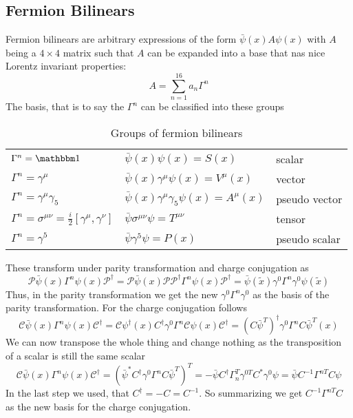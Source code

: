 \subsection{Fermion Bilinears}
Fermion bilinears are arbitrary expressions of the form $\bar \psi(x) A \psi(x)$ with $A$ being a $4 \times 4$ matrix such that $A$ can be expanded into a base that nas nice Lorentz invariant properties:
\[A = \sum_{n= 1}^{16} a_n \Gamma^n\]
The basis, that is to say the $\Gamma^n$ can be classified into these groups
\begin{table}[H]
\centering
\begin{tabular}{lll}
$\Gamma^n = \ehm$ & $\bar \psi(x) \psi(x) = S(x)$ & scalar\\
$\Gamma^n = \gamma^\mu$ & $\bar\psi(x) \gamma^\mu \psi(x) = V^\mu(x)$ & vector\\
$\Gamma^n = \gamma^\mu \gamma_5$&$\bar\psi(x) \gamma^\mu \gamma_5 \psi(x) = A^\mu(x)$ & pseudo vector\\
$\Gamma^n = \sigma^{\mu\nu} = \frac{i}{2} [\gamma^\mu, \gamma^\nu]$&$ \bar\psi \sigma^{\mu\nu} \psi = T^{\mu\nu}$& tensor\\
$\Gamma^n = \gamma^5$&$\bar \psi \gamma^5 \psi = P(x)$& pseudo scalar\\
\end{tabular}
\caption{Groups of fermion bilinears}
\end{table}
These transform under parity transformation and charge conjugation as
\[ \mathcal{P} \bar \psi (x) \Gamma^n \psi(x) \mathcal{P}^\dagger = \mathcal{P} \bar \psi(x)  \mathcal{P}\mathcal{P}^\dagger \Gamma^n \psi(x) \mathcal{P}^\dagger = \bar \psi(\tilde x) \gamma^0 \Gamma^n \gamma^0 \psi(\tilde x)\]
Thus, in the parity transformation we get the new $\gamma^0 \Gamma^n \gamma^0$ as the basis of the parity transformation. For the charge conjugation follows
\[ \mathcal{C} \bar \psi(x) \Gamma^n \psi(x) \mathcal{C}^\dagger = \mathcal C \psi^\dagger(x) C^\dagger \gamma^0 \Gamma^n \mathcal C \psi(x) \mathcal C ^\dagger = ( C \bar \psi^T)^\dagger \gamma^0 \Gamma^n C \bar \psi^T (x)\]
We can now transpose the whole thing and change nothing as the transposition of a scalar is still the same scalar
\[ \mathcal{C} \bar \psi(x) \Gamma^n \psi(x) \mathcal{C}^\dagger = ( \bar \psi ^* C^\dagger \gamma^0 \Gamma^n C \bar \psi ^T )^T = - \bar \psi C^\dagger \Gamma_n^T \gamma^{0T}C^* \gamma^0 \psi = \bar \psi C^{-1} \Gamma^{nT} C \psi\]
In the last step we used, that $C^\dagger = - C = C^{-1}$. So summarizing we get $C^{-1}\Gamma^{nT}C$ as the new basis for the charge conjugation.

